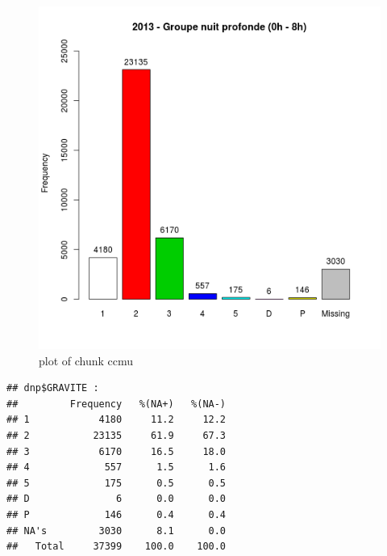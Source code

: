 \begin{Shaded}
\begin{Highlighting}[]

 \NormalTok{)}
\end{Highlighting}
\end{Shaded}

\begin{figure}[htbp]
\centering
\includegraphics{figure/ccmu3.png}
\caption{plot of chunk ccmu}
\end{figure}

\begin{verbatim}
## dnp$GRAVITE : 
##         Frequency   %(NA+)   %(NA-)
## 1            4180     11.2     12.2
## 2           23135     61.9     67.3
## 3            6170     16.5     18.0
## 4             557      1.5      1.6
## 5             175      0.5      0.5
## D               6      0.0      0.0
## P             146      0.4      0.4
## NA's         3030      8.1      0.0
##   Total     37399    100.0    100.0
\end{verbatim}

\begin{Shaded}
\begin{Highlighting}[]

\StringTok{ }
\end{Highlighting}
\end{Shaded}

